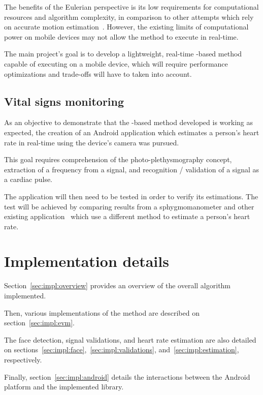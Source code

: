 The benefits of the Eulerian perspective is its low requirements for
computational resources and algorithm complexity, in comparison to other
attempts which rely on accurate motion estimation~\cite{Liu2005Motion}.
However, the existing limits of computational power on mobile devices
may not allow the \evm{} method to execute in real-time.

The main project's goal is to develop a lightweight, real-time \evm{}-based
method capable of executing on a mobile device, which will require
performance optimizations and trade-offs will have to taken into account.

\subsection{Vital signs monitoring} \label{sec:problem:heart}

As an objective to demonstrate that the \evm{}-based method developed is
working as expected, the creation of an Android application which
estimates a person's heart rate in real-time using the device's camera was
pursued.

This goal requires comprehension of the photo-plethysmography concept,
extraction of a frequency from a signal, and recognition / validation of a
signal as a cardiac pulse.

The application will then need to be tested in order to verify its estimations.
The test will be achieved by comparing results from a sphygmomanometer and
other existing application~\cite{Vitrox2013} which use a different
method to estimate a person's heart rate.

\section{Implementation details} \label{sec:impl:details}

Section~\ref{sec:impl:overview} provides an overview of the overall algorithm
implemented.

Then, various implementations of the \evm{} method are described on
section~\ref{sec:impl:evm}.

The face detection, signal validations, and heart rate estimation are
also detailed on sections~\ref{sec:impl:face},~\ref{sec:impl:validations},
and~\ref{sec:impl:estimation}, respectively.

Finally, section~\ref{sec:impl:android} details the interactions between
the Android platform and the implemented library.

